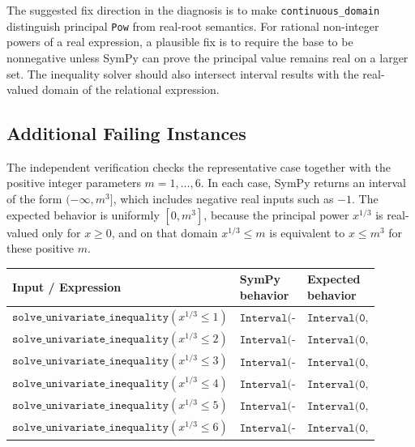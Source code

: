 \documentclass[11pt]{article}
\begin{document}
The suggested fix direction in the diagnosis is to make
\texttt{continuous\_domain} distinguish principal \texttt{Pow} from real-root
semantics. For rational non-integer powers of a real expression, a plausible
fix is to require the base to be nonnegative unless SymPy can prove the
principal value remains real on a larger set. The inequality solver should also
intersect interval results with the real-valued domain of the relational
expression.

\subsection{Additional Failing Instances}

The independent verification checks the representative case together with the
positive integer parameters \(m=1,\ldots,6\). In each case, SymPy returns an
interval of the form \((-\infty,m^3]\), which includes negative real inputs such
as \(-1\). The expected behavior is uniformly \([0,m^3]\), because the principal
power \(x^{1/3}\) is real-valued only for \(x\geq0\), and on that domain
\(x^{1/3}\leq m\) is equivalent to \(x\leq m^3\) for these positive \(m\).

\begin{center}
\small
\renewcommand{\arraystretch}{1.3}
\begin{tabular}{@{}>{\raggedright\arraybackslash}p{0.44\linewidth}>{\raggedright\arraybackslash}p{0.23\linewidth}>{\raggedright\arraybackslash}p{0.23\linewidth}@{}}
\toprule
\textbf{Input / Expression} & \textbf{SymPy behavior} & \textbf{Expected behavior} \\
\midrule
\(\texttt{solve\_univariate\_inequality}(x^{1/3}\leq 1)\) & \(\texttt{Interval(-oo, 1)}\) & \(\texttt{Interval(0, 1)}\) \\
\(\texttt{solve\_univariate\_inequality}(x^{1/3}\leq 2)\) & \(\texttt{Interval(-oo, 8)}\) & \(\texttt{Interval(0, 8)}\) \\
\(\texttt{solve\_univariate\_inequality}(x^{1/3}\leq 3)\) & \(\texttt{Interval(-oo, 27)}\) & \(\texttt{Interval(0, 27)}\) \\
\(\texttt{solve\_univariate\_inequality}(x^{1/3}\leq 4)\) & \(\texttt{Interval(-oo, 64)}\) & \(\texttt{Interval(0, 64)}\) \\
\(\texttt{solve\_univariate\_inequality}(x^{1/3}\leq 5)\) & \(\texttt{Interval(-oo, 125)}\) & \(\texttt{Interval(0, 125)}\) \\
\(\texttt{solve\_univariate\_inequality}(x^{1/3}\leq 6)\) & \(\texttt{Interval(-oo, 216)}\) & \(\texttt{Interval(0, 216)}\) \\
\bottomrule
\end{tabular}
\end{center}
\end{document}
